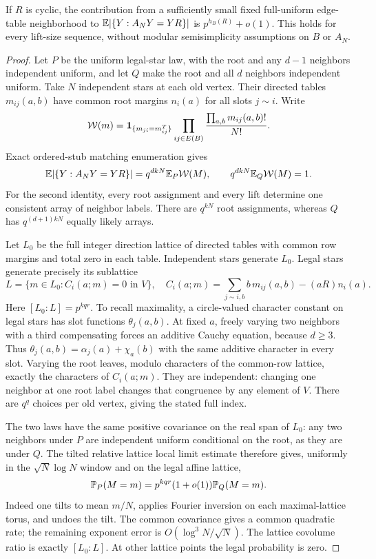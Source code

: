 \begin{lemma}\label{lift:lem:cyclic}
If $R$ is cyclic, the contribution from a sufficiently small fixed
full-uniform edge-table neighborhood to
$\mathbb E|\{Y:A_NY=YR\}|$ is $p^{h_B(R)}+o(1)$.
This holds for every lift-size sequence, without modular
semisimplicity assumptions on $B$ or $A_N$.
\end{lemma}
\begin{proof}
Let $P$ be the uniform legal-star law, with the root and any $d-1$
neighbors independent uniform, and let $Q$ make the root and all
$d$ neighbors independent uniform. Take $N$ independent stars at
each old vertex. Their directed tables $m_{ij}(a,b)$ have common
root margins $n_i(a)$ for all slots $j\sim i$. Write
\[
 \mathcal W(m)=\mathbf 1_{\{m_{ji}=m_{ij}^T\}}
       \prod_{ij\in E(B)}\frac{\prod_{a,b}m_{ij}(a,b)!}{N!}.
\]
Exact ordered-stub matching enumeration gives
\begin{equation}\label{eq:lift-two-normalizers}
 \mathbb E|\{Y:A_NY=YR\}|=q^{dkN}\mathbb E_P\mathcal W(M),
 \qquad q^{dkN}\mathbb E_Q\mathcal W(M)=1.
\end{equation}
For the second identity, every root assignment and every lift determine
one consistent array of neighbor labels. There are $q^{kN}$ root
assignments, whereas $Q$ has $q^{(d+1)kN}$ equally likely arrays.

Let $L_0$ be the full integer direction lattice of directed tables
with common row margins and total zero in each table. Independent
stars generate $L_0$. Legal stars generate precisely its sublattice
\begin{equation}\label{eq:lift-congruences}
 L=\{m\in L_0:C_i(a;m)=0\text{ in }V\},\quad
 C_i(a;m)=\sum_{j\sim i,b}b\,m_{ij}(a,b)-(aR)n_i(a).
\end{equation}
Here $[L_0:L]=p^{kqr}$. To recall maximality, a circle-valued
character constant on legal stars has slot functions
$\theta_j(a,b)$. At fixed $a$, freely varying two neighbors with a
third compensating forces an additive Cauchy equation, because
$d\ge3$. Thus $\theta_j(a,b)=\alpha_j(a)+\chi_a(b)$ with the
same additive character in every slot. Varying the root leaves,
modulo characters of the common-row lattice, exactly the characters
of $C_i(a;m)$. They are independent: changing one neighbor at one
root label changes that congruence by any element of $V$.
There are $q^q$ choices per old vertex, giving the stated full index.

The two laws have the same positive covariance on the real span
of $L_0$: any two neighbors under $P$ are independent uniform
conditional on the root, as they are under $Q$. The tilted relative
lattice local limit estimate therefore gives, uniformly in the
$\sqrt N\log N$ window and on the legal affine lattice,
\begin{equation}\label{eq:lift-relative-ratio}
 \mathbb P_P(M=m)=p^{kqr}(1+o(1))\mathbb P_Q(M=m).
\end{equation}
Indeed one tilts to mean $m/N$, applies Fourier inversion on each
maximal-lattice torus, and undoes the tilt. The common covariance
gives a common quadratic rate; the remaining exponent error is
$O(\log^3N/\sqrt N)$. The lattice covolume ratio is exactly
$[L_0:L]$. At other lattice points the legal probability is zero.


\end{proof}
